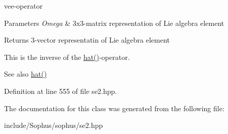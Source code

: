vee-\/operator 


\begin{DoxyParams}{Parameters}
{\em Omega} & 3x3-\/matrix representation of Lie algebra element \\
\hline
\end{DoxyParams}
\begin{DoxyReturn}{Returns}
3-\/vector representatin of Lie algebra element
\end{DoxyReturn}
This is the inverse of the \hyperlink{class_sophus_1_1_s_e2_group_base_aa5d381596ee614e1b32a36515c67287a}{hat()}-\/operator.

\begin{DoxySeeAlso}{See also}
\hyperlink{class_sophus_1_1_s_e2_group_base_aa5d381596ee614e1b32a36515c67287a}{hat()} 
\end{DoxySeeAlso}


Definition at line 555 of file se2.\+hpp.



The documentation for this class was generated from the following file\+:\begin{DoxyCompactItemize}
\item 
include/\+Sophus/sophus/se2.\+hpp\end{DoxyCompactItemize}
